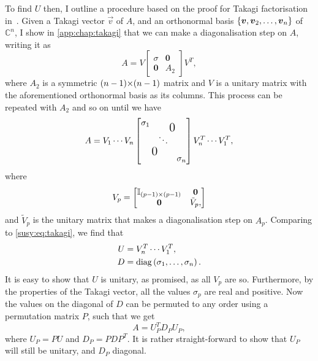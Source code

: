 \documentclass[../main.tex]{subfiles}
\begin{document}
To find \(U\) then, I outline a procedure based on the proof for Takagi factorisation in~\cite{Horn}.
Given a Takagi vector \(\vec{v}\) of \(A\), and an orthonormal basis \(\left\{\boldsymbol{v}, \boldsymbol{v}_2, \ldots, \boldsymbol{v}_n\right\}\) of \(\mathbb{C}^n\), I show in \cref{app:chap:takagi} that we can make a diagonalisation step on \(A\), writing it as
\begin{equation}
  A = V \begin{bmatrix}
    \sigma         & \boldsymbol{0} \\
    \boldsymbol{0} & A_2
  \end{bmatrix} V^T,
\end{equation}
where \(A_2\) is a symmetric \((n-1) {\times} (n-1)\) matrix and \(V\) is a unitary matrix with the aforementioned orthonormal basis as its columns.
This process can be repeated with \(A_2\) and so on until we have
\begin{equation}
  A = V_1 \cdots V_{n} \begin{bmatrix}
    \sigma_1                                            & \multicolumn{2}{c}{\raisebox{-7pt}{\mbox{\Large 0}}}   \\
                                                        & \ddots                                               & \\
    \multicolumn{2}{c}{\raisebox{7pt}{\mbox{\Large 0}}} & \sigma_n
  \end{bmatrix} V_{n}^T \cdots V_{1}^T,
\end{equation}
where
\begin{equation}
  V_p = \begin{bmatrix}
    \mathbb{I}_{(p-1) {\times} (p-1)} & \boldsymbol{0} \\
    \boldsymbol{0}               & \tilde{V}_p,
  \end{bmatrix}
\end{equation}
and \(\tilde{V}_p\) is the unitary matrix that makes a diagonalisation step on \(A_p\).
Comparing to \cref{susy:eq:takagi}, we find that
\begin{subequations}
  \begin{align}
    U & = V_{n}^T \cdots V_{1}^T,                                  \\
    D & = \operatorname{diag}\left(\sigma_1, \ldots, \sigma_n\right).
  \end{align}
\end{subequations}
It is easy to show that \(U\) is unitary, as promised, as all \(V_{p}\) are so.
Furthermore, by the properties of the Takagi vector, all the values \(\sigma_p\) are real and positive.
Now the values on the diagonal of \(D\) can be permuted to any order using a permutation matrix \(P\), such that we get
\begin{equation}
  A = U_P^T D_P U_P,
\end{equation}
where \(U_P = P U\) and \(D_P = P D P^T\).
It is rather straight-forward to show that \(U_P\) will still be unitary, and \(D_P\) diagonal.
\end{document}
